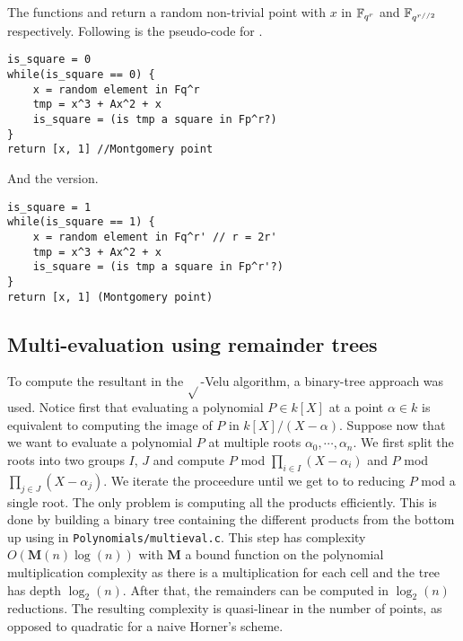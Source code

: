 \documentclass[../main.tex]{subfilesubs}
\begin{document}
The functions  and  return a random non-trivial point with $x$ in $\mathbb{F}_{q^{r}}$ and $\mathbb{F}_{q^{r//2}}$ respectively.
Following is the pseudo-code for .
\begin{verbatim}
is_square = 0
while(is_square == 0) {
	x = random element in Fq^r
	tmp = x^3 + Ax^2 + x
	is_square = (is tmp a square in Fp^r?)
}
return [x, 1] //Montgomery point
\end{verbatim}
And the  version.
\begin{verbatim}
is_square = 1
while(is_square == 1) {
	x = random element in Fq^r' // r = 2r'
	tmp = x^3 + Ax^2 + x
	is_square = (is tmp a square in Fp^r'?)
}
return [x, 1] (Montgomery point)
\end{verbatim}



\subsection{Multi-evaluation using remainder trees}
To compute the resultant in the $\sqrt{}$-Velu algorithm, a binary-tree approach was used.
Notice first that evaluating a polynomial $P\in k[X]$ at a point $\alpha\in k$ is equivalent to computing the image of $P$ in $k[X]/(X-\alpha)$.
Suppose now that we want to evaluate a polynomial $P$ at multiple roots $\alpha_0, \cdots,\alpha_n$.
We first split the roots into two groups $I$, $J$ and compute $P$ mod $\prod_{i\in I} (X-\alpha_i)$ and $P$ mod $\prod_{j\in J} (X-\alpha_j)$.
We iterate the proceedure until we get to to reducing $P$ mod a single root.
The only problem is computing all the products efficiently.
This is done by building a binary tree containing the different products from the bottom up using  in \texttt{Polynomials/multieval.c}.
This step has complexity $O(\mathbf{M}(n)\log(n))$ with $\mathbf{M}$ a bound function on the polynomial multiplication complexity as there is a multiplication for each cell and the tree has depth $\log_2(n)$.
After that, the remainders can be computed in $\log_2(n)$ reductions.
The resulting complexity is quasi-linear in the number of points, as opposed to quadratic for a naive Horner's scheme.
\end{document}
